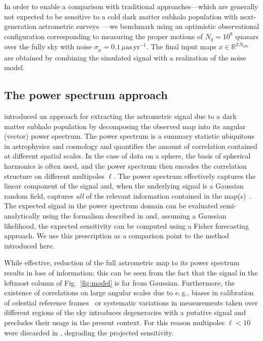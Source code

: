 \documentclass[twocolumn,linenumbers,anonymous]{aastex631}
\newcommand{\eg}{{e.\,g.}\xspace}
\newcommand{\changes}[1]{{{\color{red}#1}}}
\begin{document}
In order to enable a comparison with traditional approaches---which are generally not expected to be sensitive to a cold dark matter subhalo population with next-generation astrometric surveys~\citep{VanTilburg:2018ykj,Mishra-Sharma:2020ynk}---we benchmark using an optimistic observational configuration corresponding to measuring the proper motions of $N_q = 10^8$ quasars \changes{over the fully sky} with noise $\sigma_{\mu} = 0.1\,\mu\mathrm{as}\,\mathrm{yr}^{-1}$. \changes{The final input maps $x\in\mathbb R^{2\,N_\mathrm{pix}}$ are obtained by combining the simulated signal with a realization of the noise model.}

\subsection{The power spectrum approach} 

\citet{Mishra-Sharma:2020ynk} introduced an approach for extracting the astrometric signal due to a dark matter subhalo population by decomposing the observed map into its angular (vector) power spectrum. The power spectrum is a summary statistic ubiquitous in astrophysics and cosmology and quantifies the amount of correlation contained at different spatial scales. In the case of data on a sphere, the basis of spherical harmonics is often used, and the power spectrum then encodes the correlation structure on different multipoles $\ell$. The power spectrum effectively captures the linear component of the signal and, when the underlying signal is a Gaussian random field, captures \emph{all} of the relevant information contained in the map(s)~\citep{Tegmark:1996qt}.
The expected signal in the power spectrum domain can be evaluated semi-analytically using the formalism described in \citet{Mishra-Sharma:2020ynk} and, assuming a Gaussian likelihood, the expected sensitivity can be computed using a Fisher forecasting approach. We use this prescription as a comparison point to the method introduced here.

While effective, reduction of the full astrometric map to its power spectrum results in loss of information; this can be seen from the fact that the signal in the leftmost column of Fig.~\ref{fig:model} is far from Gaussian. Furthermore, the existence of correlations on large angular scales due to \eg, biases in calibration of celestial reference frames~\citep{2018A&A...616A..14G} or systematic variations in measurements taken over different regions of the sky introduces degeneracies with a putative signal and precludes their usage in the present context. For this reason multipoles $\ell < 10$ were discarded in \citet{Mishra-Sharma:2020ynk}, degrading the projected sensitivity.
\end{document}
